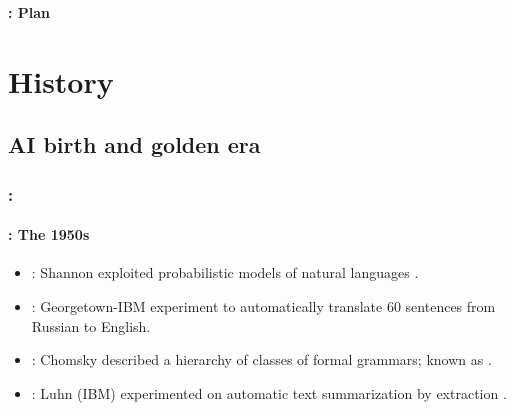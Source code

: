 \documentclass[xcolor=table]{beamer}
\begin{document}
\begin{frame}
	\frametitle{\inserttitle}
	\framesubtitle{\insertshortsubtitle: Plan}
	
	\begin{multicols}{2}
		\tableofcontents
	\end{multicols}

\end{frame}

\section{History}

\begin{frame}
	\frametitle{\insertshortsubtitle}
	\framesubtitle{\insertsection}


\end{frame}

\subsection{AI birth and golden era}

\begin{frame}
	\frametitle{\insertshortsubtitle: \insertsection}
	\framesubtitle{\insertsubsection: The 1950s}

	\begin{itemize}
		\item {}: Shannon exploited probabilistic models of natural languages \cite{1951-shannon}.
		\item {}: Georgetown-IBM experiment to automatically translate 60 sentences from Russian to English.
		\item {}: Chomsky described a hierarchy of classes of formal grammars; known as .
		\item {}: Luhn (IBM) experimented on automatic text summarization by extraction \cite{1958-luhn}.
	\end{itemize}

\end{frame}
\end{document}
